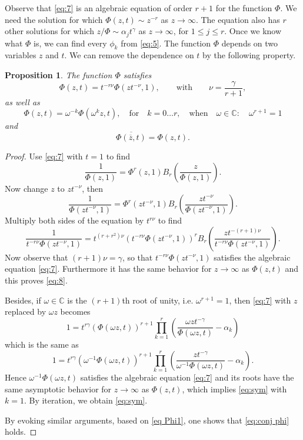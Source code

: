 \documentclass[12pt]{article}
\newtheorem{proposition}{Proposition}[section]
\numberwithin{equation}{section}
\begin{document}
Observe that \eqref{eq:7} is an algebraic equation of order $r+1$ for the function $\Phi$. 
We need the solution for which $\Phi(z,t) \sim z^{-r}$ as $z \to \infty$.
The equation also has $r$ other solutions for which $z/\Phi \sim \alpha_j t^\gamma$ as $z \to \infty$, for $1 \leq j \leq r$. 
Once we know what $\Phi$ is, we can find every $\phi_k$ from \eqref{eq:5}.
The function $\Phi$ depends on two variables $z$ and $t$. We can remove the dependence on $t$ by the following property.

\begin{proposition}  \label{prop:1}
The function $\Phi$ satisfies
\begin{equation}   \label{eq:8}
    \Phi(z,t) = {t}^{-r\nu} \Phi( z {t}^{-\nu},1), \qquad\text{with}\qquad \nu = \frac{\gamma}{r+1} , 
\end{equation}
as well as %
\begin{equation}\label{eq:sym}
	\Phi(z,t) =\omega^{-k}\Phi(\omega^k z,t) ,\quad \text{for}\quad k=0\ldots r, \quad\text{when}\quad \omega\in\mathbb{C}:\quad \omega^{r+1}=1 
\end{equation}
and 
\begin{equation}\label{eq:conj phi}
	\overline{\Phi(\overline{z},t)} = \Phi(z,t). 
\end{equation}

\end{proposition}

\begin{proof}
Use \eqref{eq:7} with $t=1$ to find
\begin{equation}\label{eq Phi1}
    \frac{1}{\Phi(z,1)} =  \Phi^r(z,1) B_r \left( \frac{z}{\Phi(z,1)} \right). 
\end{equation}
Now change $z$ to $zt^{-\nu}$, then
\[    \frac{1}{\Phi(zt^{-\nu},1)} =  \Phi^r(zt^{-\nu},1) B_r \left( \frac{zt^{-\nu}}{\Phi(zt^{-\nu},1)} \right). \]
Multiply both sides of the equation by $t^{r\nu}$ to find
\[ \frac{1}{t^{-r\nu} \Phi(zt^{-\nu},1)} = t^{(r+r^2)\nu} \left( t^{-r\nu} \Phi(zt^{-\nu},1) \right)^r  B_r \left( \frac{zt^{-(r+1)\nu}}{t^{-r\nu} \Phi(zt^{-\nu},1)} \right). \]
Now observe that $(r+1)\nu=\gamma$, so that $t^{-r\nu} \Phi(zt^{-\nu},1)$ satisfies the algebraic equation \eqref{eq:7}. Furthermore it has the same behavior for $z \to \infty$ as
$\Phi(z,t)$ and this proves \eqref{eq:8}.

Besides, if $\omega\in\mathbb{C}$ is the $(r+1)$th root of unity, i.e. $\omega^{r+1}=1$, then \eqref{eq:7} with $z$ replaced by $\omega z$ becomes 
\[
	1= t^{r\gamma} \left(\Phi(\omega z,t)\right)^{r+1} \prod_{k=1}^r \left(\frac{\omega z t^{-\gamma}}{ \Phi(\omega z,t)} -\alpha_k\right) 
\]
which is the same as 
\[
	1= t^{r\gamma} \left(\omega^{-1}\Phi(\omega z,t)\right)^{r+1} \prod_{k=1}^r \left(\frac{z t^{-\gamma}}{\omega^{-1} \Phi(\omega z,t)} -\alpha_k\right) . 
\]
Hence $\omega^{-1}\Phi(\omega z,t)$ satisfies the algebraic equation \eqref{eq:7} and its roots have the same asymptotic behavior for $z\to\infty$ as $\Phi(z,t)$, which implies \eqref{eq:sym} with $k=1$. By iteration, we obtain \eqref{eq:sym}. 

By evoking similar arguments, based on \eqref{eq Phi1}, one shows that \eqref{eq:conj phi} holds. 
\end{proof}
\end{document}

